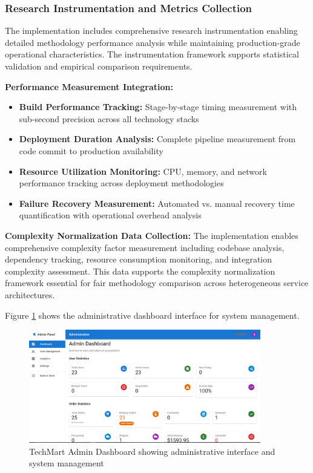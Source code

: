 \subsubsection{Research Instrumentation and Metrics Collection}

The implementation includes comprehensive research instrumentation enabling detailed methodology performance analysis while maintaining production-grade operational characteristics. The instrumentation framework supports statistical validation and empirical comparison requirements.

\textbf{Performance Measurement Integration:}
\begin{itemize}
\item \textbf{Build Performance Tracking:} Stage-by-stage timing measurement with sub-second precision across all technology stacks
\item \textbf{Deployment Duration Analysis:} Complete pipeline measurement from code commit to production availability
\item \textbf{Resource Utilization Monitoring:} CPU, memory, and network performance tracking across deployment methodologies
\item \textbf{Failure Recovery Measurement:} Automated vs. manual recovery time quantification with operational overhead analysis
\end{itemize}

\textbf{Complexity Normalization Data Collection:}
The implementation enables comprehensive complexity factor measurement including codebase analysis, dependency tracking, resource consumption monitoring, and integration complexity assessment. This data supports the complexity normalization framework essential for fair methodology comparison across heterogeneous service architectures.

Figure \ref{fig:techmart-admin-dashboard} shows the administrative dashboard interface for system management.

\begin{figure}[H]
\centering
\includegraphics[width=0.9\textwidth]{figures/chapter5/techmart-admin-dashboard.png}
\caption{TechMart Admin Dashboard showing administrative interface and system management}
\label{fig:techmart-admin-dashboard}
\end{figure}

